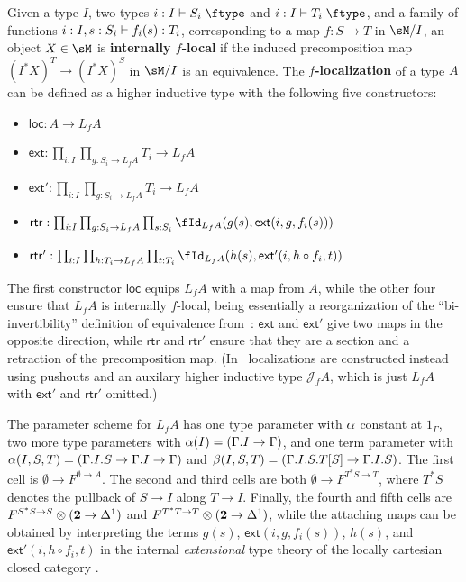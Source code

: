 \begin{enumerate}
\begin{enumerate}
\begin{eg} \label{eg:localization}
  Given a type $I$, two types $i:I\types S_i\type$ and $i:I\types T_i\type$, and a family of functions $i:I,s:S_i \vdash f_i(s) : T_i$, corresponding to a map $f:S\to T$ in $\sM/I$, an object $X\in \sM$ is \textbf{internally $f$-local} if the induced precomposition map $(I^*X)^T \to (I^*X)^S$ in $\sM/I$ is an equivalence.
  The \textbf{$f$-localization} of a type $A$ can be defined as a higher inductive type with the following five constructors:
  \begin{itemize}
  \item $\mathsf{loc}:A\to L_f A$
  \item $\mathsf{ext}:\prod_{i:I} \prod_{g:S_i \to L_f A} T_i \to L_f A$
  \item $\mathsf{ext}':\prod_{i:I} \prod_{g:S_i \to L_f A} T_i \to L_f A$
  \item $\mathsf{rtr}:\prod_{i:I} \prod_{g:S_i \to L_f A} \prod_{s:S_i} \id[L_f A]{g(s)}{\mathsf{ext}(i,g,f_i(s))}$
  \item $\mathsf{rtr}':\prod_{i:I} \prod_{h:T_i \to L_f A} \prod_{t:T_i} \id[L_f A]{h(s)}{\mathsf{ext}'(i,h\circ f_i,t)}$
  \end{itemize}
  The first constructor $\mathsf{loc}$ equips $L_f A$ with a map from $A$, while the other four ensure that $L_f A$ is internally $f$-local, being essentially a reorganization of the ``bi-invertibility'' definition of equivalence from~\cite[Chapter 4]{hottbook}: $\mathsf{ext}$ and $\mathsf{ext}'$ give two maps in the opposite direction, while $\mathsf{rtr}$ and $\mathsf{rtr}'$ ensure that they are a section and a retraction of the precomposition map.
  (In~\cite{rss:modalities} localizations are constructed instead using pushouts and an auxilary higher inductive type $\mathcal{J}_f A$, which is just $L_f A$ with $\mathsf{ext}'$ and $\mathsf{rtr}'$ omitted.)

  The parameter scheme for $L_f A$ has one type parameter with $\alpha$ constant at $1_\Gamma$, two more type parameters with $\alpha(I) = (\Gamma.I\to\Gamma)$, and one term parameter with $\alpha(I,S,T) = (\Gamma.I.S\to \Gamma.I\to\Gamma)$ and $\beta(I,S,T) = (\Gamma.I.S.T[S] \to \Gamma.I.S)$.
  The first cell is $\emptyset \to F^{\emptyset\to A}$.
  The second and third cells are both $\emptyset \to F^{T^*S \to T}$, where $T^*S$ denotes the pullback of $S\to I$ along $T\to I$.
  Finally, the fourth and fifth cells are $F^{S^*S\to S} \otimes (\mathbf{2}\to {\Delta^1})$ and $F^{T^*T\to T} \otimes (\mathbf{2}\to {\Delta^1})$, while the attaching maps can be obtained by interpreting the terms $g(s)$, ${\mathsf{ext}(i,g,f_i(s))}$, $h(s)$, and ${\mathsf{ext}'(i,h\circ f_i,t)}$ in the internal \emph{extensional} type theory of the locally cartesian closed category \sM.
\end{eg}


\end{enumerate}
\end{enumerate}
